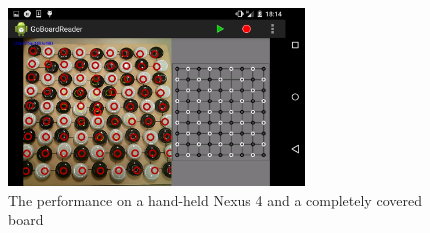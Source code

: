 	\begin{figure}[h]
		\center
		\includegraphics[width=0.7\textwidth]{images/android_perfect_recognition.png}
		\caption{The performance on a hand-held Nexus 4 and a completely covered board}
		\label{fig:android_perfect_recognition}
	\end{figure}
